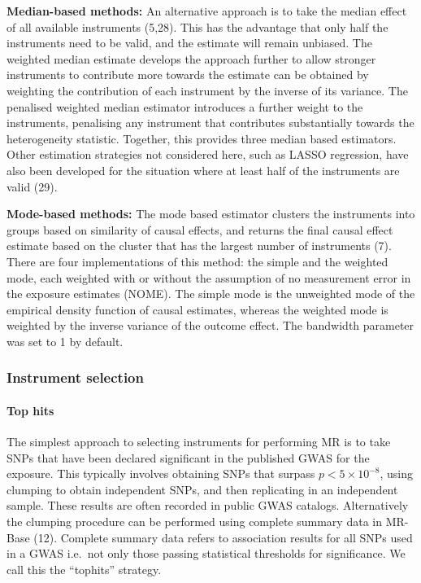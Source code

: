 \documentclass[]{article}
\let\oldparagraph\paragraph
\renewcommand{\paragraph}[1]{\oldparagraph{#1}\mbox{}}
\begin{document}
\textbf{Median-based methods:} An alternative approach is to take the
median effect of all available instruments (5,28). This has the
advantage that only half the instruments need to be valid, and the
estimate will remain unbiased. The weighted median estimate develops the
approach further to allow stronger instruments to contribute more
towards the estimate can be obtained by weighting the contribution of
each instrument by the inverse of its variance. The penalised weighted
median estimator introduces a further weight to the instruments,
penalising any instrument that contributes substantially towards the
heterogeneity statistic. Together, this provides three median based
estimators. Other estimation strategies not considered here, such as
LASSO regression, have also been developed for the situation where at
least half of the instruments are valid (29).

\textbf{Mode-based methods:} The mode based estimator clusters the
instruments into groups based on similarity of causal effects, and
returns the final causal effect estimate based on the cluster that has
the largest number of instruments (7). There are four implementations of
this method: the simple and the weighted mode, each weighted with or
without the assumption of no measurement error in the exposure estimates
(NOME). The simple mode is the unweighted mode of the empirical density
function of causal estimates, whereas the weighted mode is weighted by
the inverse variance of the outcome effect. The bandwidth parameter was
set to 1 by default.

\subsubsection{Instrument selection}\label{instrument-selection}

\paragraph{Top hits}\label{top-hits}

The simplest approach to selecting instruments for performing MR is to
take SNPs that have been declared significant in the published GWAS for
the exposure. This typically involves obtaining SNPs that surpass
\(p < 5 \times 10^{-8}\), using clumping to obtain independent SNPs, and
then replicating in an independent sample. These results are often
recorded in public GWAS catalogs. Alternatively the clumping procedure
can be performed using complete summary data in MR-Base (12). Complete
summary data refers to association results for all SNPs used in a GWAS
i.e.~not only those passing statistical thresholds for significance. We
call this the ``tophits'' strategy.
\end{document}
